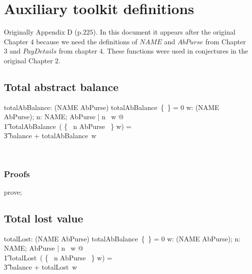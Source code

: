 \chapter{Auxiliary toolkit definitions}\label{apD}

Originally Appendix D (p.$225$). In this document it appears after the original
Chapter $4$ because we need the definitions of $NAME$ and $AbPurse$ from
Chapter $3$ and $PayDetails$ from chapter $4$. These functions were used in
conjectures in the original Chapter $2$.

\section{Total abstract balance}

\begin{LADef}
\begin{axdef}
   totalAbBalance: (NAME \ffun AbPurse) \fun \nat
\where
      totalAbBalance~\{~\} = 0
   \also
      \forall w: (NAME \ffun AbPurse); n: NAME; AbPurse | n \notin \dom~w @ \\
          \t1 totalAbBalance~( \{~ n \mapsto \theta AbPurse ~\} \cup w) = \\
                \t3 balance + totalAbBalance~w
\end{axdef}~\end{LADef}

\subsection*{Proofs}

\begin{LDCheck}\begin{zproof}
   prove;
\end{zproof}\end{LDCheck}

\section{Total lost value}

\begin{LADef}
\begin{axdef}
   totalLost: (NAME \ffun AbPurse) \fun \nat
\where
      totalAbBalance~\{~\} = 0
   \also
      \forall w: (NAME \ffun AbPurse); n: NAME; AbPurse | n \notin \dom~w @ \\
          \t1 totalLost~( \{~ n \mapsto \theta AbPurse ~\} \cup w) = \\
                \t3 balance + totalLost~w
\end{axdef}~\end{LADef}

